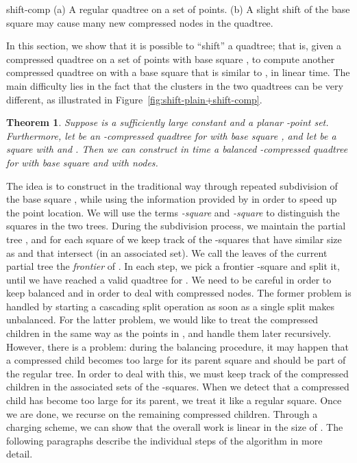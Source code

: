 \documentclass[11pt]{paper}
\newtheorem {theorem} {Theorem}[section]
\begin{document}
 {shift-comp}
{
  (a) A regular quadtree on a set of  points.
  (b) A slight shift of the base square may cause many new compressed nodes in the quadtree.
}

    In this section, we show that it is possible to ``shift'' a quadtree; that is, given a compressed quadtree on a set of points  with base square , to compute another compressed quadtree on  with a base square that is similar to , in linear time.
    The main difficulty lies in the fact that the clusters in the two quadtrees can be very different, as illustrated in Figure~\ref {fig:shift-plain+shift-comp}.

    \begin {theorem} \label {thm:shiftbalance}
      Suppose  is a sufficiently large constant and
       a planar -point set.
      Furthermore, let  be an -compressed quadtree
      for  with base square , and let  be a square with
       and . 
      Then we can construct in  time a balanced -compressed quadtree 
      for  with base square  and with  nodes.
    \end {theorem}

    The idea is to construct  in the traditional way through
    repeated subdivision of the base square , while using the information
    provided by  in order to speed up the point location. 
    We will use the terms \emph{-square} and \emph{-square} to
    distinguish the squares in the two trees.
    During the subdivision process, we maintain the partial tree , 
    and for each square  of  
    we keep track of the -squares that have similar size
    as  and that intersect  (in an associated set). 
    We call the leaves of the current partial tree the
    \emph{frontier} of . In each step, we
    pick a frontier -square and split it, until we have reached
    a valid quadtree for . 
    We need to be careful in order to keep  
    balanced and in order to deal with compressed nodes. The former problem
    is handled by starting a cascading split operation as soon as 
    a single split makes  unbalanced.
    For the latter problem, we would like to treat the compressed children
      in the same way as the points in , and handle them
      later recursively. However, there is a problem: during the
      balancing procedure, it may happen that a compressed child becomes
      too large for its parent square and should be part of the regular
      tree. In order to deal with this, we must keep track of the compressed
      children in the associated sets of the -squares. When we detect
      that a compressed child has become too large for its parent, we treat
      it like a regular square. Once we are done, we recurse on the 
      remaining compressed children. Through a charging scheme, we can show
      that the overall work is linear in the size of .
      The following paragraphs describe the individual steps of the algorithm 
      in more detail.
\end{document}
